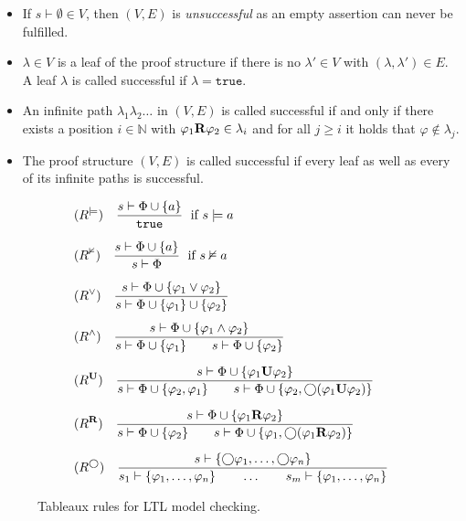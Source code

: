 \documentclass[a4paper, 12pt, twoside]{report}
\begin{document}
	\begin{itemize}
		\item If $s \vdash \emptyset \in V$, then $(V,E)$ is \textit{unsuccessful} as an empty assertion can never be fulfilled.
		\item $\lambda \in V$ is a leaf of the proof structure if there is no $\lambda' \in V$ with $(\lambda, \lambda') \in E$. A leaf $\lambda$ is called successful if $\lambda = \texttt{true}$.
		\item An infinite path $\lambda_1 \lambda_2 \dots$ in $(V,E)$ is called successful if and only if there exists a position $i\in \mathds{N}$ with $\varphi_1 \text{\textbf{R}} \varphi_2 \in \lambda_i$ and for all $j \geq i$ it holds that $\varphi \notin \lambda_j$.
		\item The proof structure $(V,E)$ is called successful if every leaf as well as every of its infinite paths is successful.
	\end{itemize} 

	\begin{figure}
		\begin{align*}
		&(R^{\models}) \quad \frac{s \vdash \Phi \cup \{a\}}{\texttt{true}} \; \text{ if } s \models a \\[1.5ex]
		&(R^{\nvDash}) \quad \frac{s \vdash \Phi \cup \{a\}}{s \vdash \Phi} \; \text{ if } s \nvDash a \\[1.5ex]
		&(R^{\vee}) \quad \frac{s \vdash \Phi \cup \{\varphi_1 \vee \varphi_2\}}{s \vdash \Phi \cup \{\varphi_1\} \cup \{\varphi_2\}}\\[1ex]
		&(R^{\wedge}) \quad \frac{s \vdash \Phi \cup \{\varphi_1 \wedge \varphi_2\}}{s \vdash \Phi \cup \{\varphi_1\} \qquad s \vdash \Phi\cup \{\varphi_2\}}\\[1.5ex]
		&(R^{\text{\textbf{U}}}) \quad \frac{s \vdash \Phi \cup \{\varphi_1 \text{\textbf{U}} \varphi_2\}}{s \vdash \Phi \cup \{\varphi_2, \varphi_1\} \qquad s \vdash \Phi\cup \{\varphi_2, \bigcirc(\varphi_1 \text{\textbf{U}} \varphi_2)\}}\\[1.5ex]
		&(R^{\text{\textbf{R}}}) \quad \frac{s \vdash \Phi \cup \{\varphi_1 \text{\textbf{R}} \varphi_2\}}{s \vdash \Phi \cup \{\varphi_2\} \qquad s \vdash \Phi\cup \{\varphi_1, \bigcirc(\varphi_1 \text{\textbf{R}} \varphi_2)\}}\\[1.5ex]
		&(R^{\bigcirc}) \quad \frac{s \vdash \{\bigcirc \varphi_1, \dots, \bigcirc \varphi_n\}}{s_1 \vdash \{\varphi_1, \dots, \varphi_n\} \qquad \dots \qquad s_m \vdash \{\varphi_1, \dots, \varphi_n\}}\\
		\end{align*}
		\caption{Tableaux rules for LTL model checking.}\label{fig:tableaux_rules}
	\end{figure}
	
\end{document}
